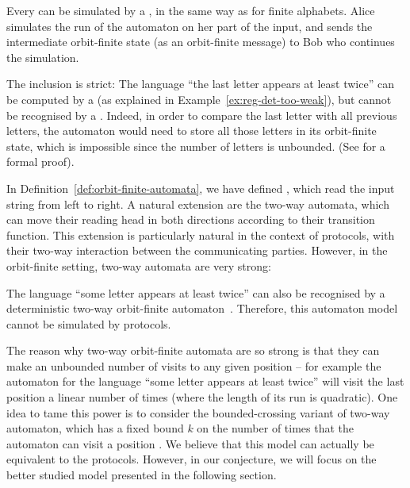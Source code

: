 \begin{myexample} \label{ex:protocol-not-dofa}
  Every  can be simulated by a 
  , in the same way as for finite alphabets.
  Alice simulates the run of the automaton on her part of the input, 
  and sends the intermediate orbit-finite state (as an orbit-finite message)
  to Bob who continues the simulation.  
  
  The inclusion is strict: The language ``the last letter appears at least
  twice'' can be computed by a  (as explained in
  Example~\ref{ex:reg-det-too-weak}), but cannot be recognised by a 
  . Indeed, in order to compare the
  last letter with all previous letters, the automaton would need to store all
  those letters in its orbit-finite state, which is impossible since the number of letters 
  is unbounded. (See \cite[Example~4]{kaminskiFiniteMemoryAutomata1994} for a formal proof).
\end{myexample}

In Definition~\ref{def:orbit-finite-automata}, we have defined , which read the input string from left to right. A
natural extension are the two-way automata, which can move their reading head
in both directions according to their transition function. This extension is
particularly natural in the context of protocols, with their two-way
interaction between the communicating parties. However, in the orbit-finite
setting, two-way automata are very strong:

\begin{myexample}\label{ex:protocol-not-2dofa}
    The language ``some letter appears at least twice'' can also be recognised
    by a deterministic two-way orbit-finite automaton~\cite[Example
    18]{bojanczyk_slightly}. Therefore, this automaton model cannot be
    simulated by protocols.

    The reason why two-way orbit-finite automata are so strong is that they can
    make an unbounded number of visits to any given position -- for example the
    automaton for the language ``some letter appears at least twice'' will
    visit the last position a linear number of times (where the length of its run is
    quadratic). One idea to tame this power is to consider the bounded-crossing
    variant of two-way automaton, which has a fixed bound $k$ on the number of
    times that the automaton can visit a position \cite[p.~92]{neven2003power}.
    We believe that this model can actually be equivalent to the protocols.
    However, in our conjecture, we will focus on the better studied model
    presented in the following section.
\end{myexample}

